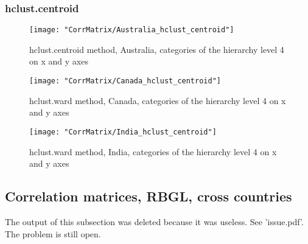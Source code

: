 \documentclass[a4paper]{article}
\begin{document}
\subsubsection{hclust.centroid}

\begin{figure}[H]
\begin{center}
\texttt{[image: "CorrMatrix/Australia\_hclust\_centroid"]}
\caption{hclust.centroid method, Australia, categories of the hierarchy level 4 on x and y axes}
\label{fig:2}
\end{center}
\end{figure}

\begin{figure}[H]
\begin{center}
\texttt{[image: "CorrMatrix/Canada\_hclust\_centroid"]}
\caption{hclust.ward method, Canada, categories of the hierarchy level 4 on x and y axes}
\label{fig:2}
\end{center}
\end{figure}

\begin{figure}[H]
\begin{center}
\texttt{[image: "CorrMatrix/India\_hclust\_centroid"]}
\caption{hclust.ward method, India, categories of the hierarchy level 4 on x and y axes}
\label{fig:2}
\end{center}
\end{figure}

\subsection{Correlation matrices,  RBGL,  cross countries}
The output of this subsection was deleted because it was useless. See
'issue.pdf'. The problem is still open.

\end{document}
